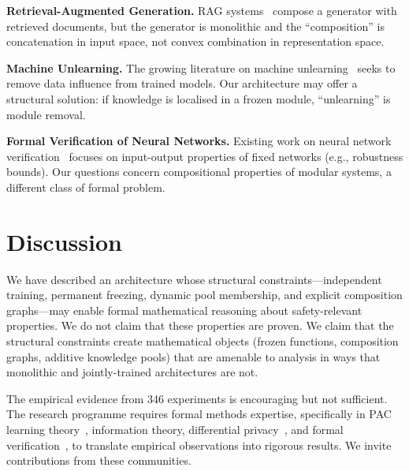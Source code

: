\documentclass[11pt,a4paper]{article}
\begin{document}
\textbf{Retrieval-Augmented Generation.} RAG systems~\cite{lewis2020retrieval} compose a generator with retrieved documents, but the generator is monolithic and the ``composition'' is concatenation in input space, not convex combination in representation space.

\textbf{Machine Unlearning.} The growing literature on machine unlearning~\cite{bourtoule2021machine} seeks to remove data influence from trained models. Our architecture may offer a structural solution: if knowledge is localised in a frozen module, ``unlearning'' is module removal.

\textbf{Formal Verification of Neural Networks.} Existing work on neural network verification~\cite{katz2017reluplex} focuses on input-output properties of fixed networks (e.g., robustness bounds). Our questions concern compositional properties of modular systems, a different class of formal problem.

\section{Discussion}
\label{sec:discussion}

We have described an architecture whose structural constraints---independent training, permanent freezing, dynamic pool membership, and explicit composition graphs---may enable formal mathematical reasoning about safety-relevant properties.
We do not claim that these properties are proven.
We claim that the structural constraints create mathematical objects (frozen functions, composition graphs, additive knowledge pools) that are amenable to analysis in ways that monolithic and jointly-trained architectures are not.

The empirical evidence from 346 experiments is encouraging but not sufficient.
The research programme requires formal methods expertise, specifically in PAC learning theory~\cite{valiant1984theory}, information theory, differential privacy~\cite{dwork2014algorithmic}, and formal verification~\cite{katz2017reluplex}, to translate empirical observations into rigorous results.
We invite contributions from these communities.
\end{document}
